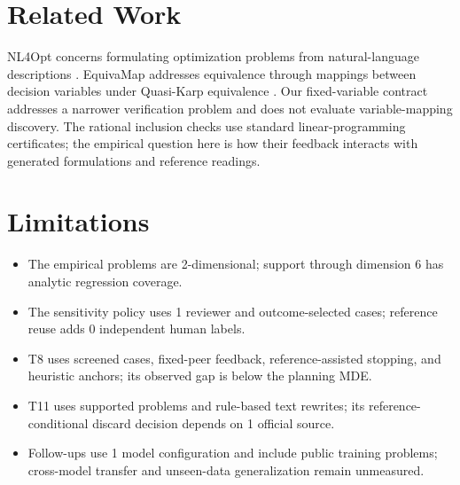 \documentclass[letterpaper]{article}
\begin{document}
\section{Related Work}
NL4Opt concerns formulating optimization problems from natural-language descriptions \citep{ramamonjison2022nl4opt}. EquivaMap addresses equivalence through mappings between decision variables under Quasi-Karp equivalence \citep{zhai2025equivamap}. Our fixed-variable contract addresses a narrower verification problem and does not evaluate variable-mapping discovery. The rational inclusion checks use standard linear-programming certificates; the empirical question here is how their feedback interacts with generated formulations and reference readings.

\section{Limitations}
\begin{itemize}
\item The empirical problems are 2-dimensional; support through dimension 6 has analytic regression coverage.
\item The sensitivity policy uses 1 reviewer and outcome-selected cases; reference reuse adds 0 independent human labels.
\item T8 uses \LadderN{} screened cases, fixed-peer feedback, reference-assisted stopping, and heuristic anchors; its observed gap is below the planning MDE.
\item T11 uses \MetaN{} supported problems and rule-based text rewrites; its reference-conditional discard decision depends on 1 official source.
\item Follow-ups use 1 model configuration and include public training problems; cross-model transfer and unseen-data generalization remain unmeasured.
\end{itemize}


\end{document}
